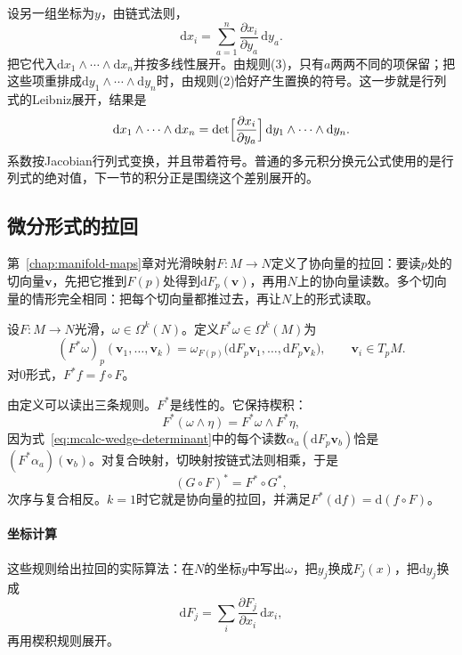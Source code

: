 设另一组坐标为$y$，由链式法则，
\[
\mathrm dx_i=\sum_{a=1}^n\frac{\partial x_i}{\partial y_a}\,\mathrm dy_a .
\]
把它代入$\mathrm dx_1\wedge\cdots\wedge\mathrm dx_n$并按多线性展开。由规则(3)，只有$a$两两不同的项保留；把这些项重排成$\mathrm dy_1\wedge\cdots\wedge\mathrm dy_n$时，由规则(2)恰好产生置换的符号。这一步就是行列式的Leibniz展开，结果是
\begin{equation}
\mathrm dx_1\wedge\cdots\wedge\mathrm dx_n=\det\Bigl[\frac{\partial x_i}{\partial y_a}\Bigr]\,\mathrm dy_1\wedge\cdots\wedge\mathrm dy_n .
\label{eq:mcalc-top-form-change}
\end{equation}
系数按Jacobian行列式变换，并且带着符号。普通的多元积分换元公式使用的是行列式的绝对值，下一节的积分正是围绕这个差别展开的。

\subsection{微分形式的拉回}
\label{sec:mcalc-pullback}

第~\ref{chap:manifold-maps}章对光滑映射$F:M\to N$定义了协向量的拉回：要读$p$处的切向量$\bm v$，先把它推到$F(p)$处得到$\mathrm dF_p(\bm v)$，再用$N$上的协向量读数。多个切向量的情形完全相同：把每个切向量都推过去，再让$N$上的形式读取。

\begin{definition}[微分形式的拉回]
\label{def:mcalc-pullback}
设$F:M\to N$光滑，$\omega\in\Omega^k(N)$。定义$F^*\omega\in\Omega^k(M)$为
\begin{equation}
(F^*\omega)_p(\bm v_1,\ldots,\bm v_k)=\omega_{F(p)}\bigl(\mathrm dF_p\bm v_1,\ldots,\mathrm dF_p\bm v_k\bigr),\qquad\bm v_i\in T_pM.
\label{eq:mcalc-pullback}
\end{equation}
对$0$形式，$F^*f=f\circ F$。
\end{definition}

由定义可以读出三条规则。$F^*$是线性的。它保持楔积：
\[
F^*(\omega\wedge\eta)=F^*\omega\wedge F^*\eta ,
\]
因为式~\eqref{eq:mcalc-wedge-determinant}中的每个读数$\alpha_a(\mathrm dF_p\bm v_b)$恰是$(F^*\alpha_a)(\bm v_b)$。对复合映射，切映射按链式法则相乘，于是
\[
(G\circ F)^*=F^*\circ G^* ,
\]
次序与复合相反。$k=1$时它就是协向量的拉回，并满足$F^*(\mathrm df)=\mathrm d(f\circ F)$。

\paragraph{坐标计算}
这些规则给出拉回的实际算法：在$N$的坐标$y$中写出$\omega$，把$y_j$换成$F_j(x)$，把$\mathrm dy_j$换成
\[
\mathrm dF_j=\sum_i\frac{\partial F_j}{\partial x_i}\,\mathrm dx_i ,
\]
再用楔积规则展开。

